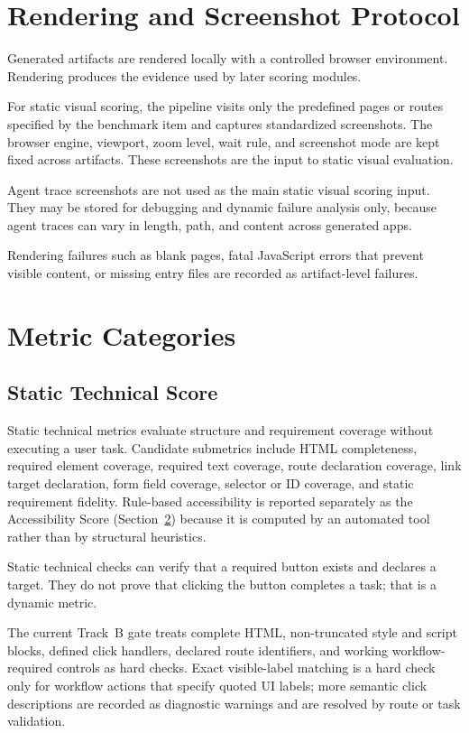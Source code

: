 \section{Rendering and Screenshot Protocol}
\label{sec:rendering}

Generated artifacts are rendered locally with a controlled browser environment.
Rendering produces the evidence used by later scoring modules.

For static visual scoring, the pipeline visits only the predefined pages or
routes specified by the benchmark item and captures standardized screenshots.
The browser engine, viewport, zoom level, wait rule, and screenshot mode are
kept fixed across artifacts. These screenshots are the input to static visual
evaluation.

Agent trace screenshots are not used as the main static visual scoring input.
They may be stored for debugging and dynamic failure analysis only, because
agent traces can vary in length, path, and content across generated apps.

Rendering failures such as blank pages, fatal JavaScript errors that prevent
visible content, or missing entry files are recorded as artifact-level failures.

\section{Metric Categories}
\label{sec:metric-categories}

\subsection{Static Technical Score}

Static technical metrics evaluate structure and requirement coverage without
executing a user task. Candidate submetrics include HTML completeness, required
element coverage, required text coverage, route declaration coverage, link
target declaration, form field coverage, selector or ID coverage, and static
requirement fidelity. Rule-based accessibility is reported separately as the
Accessibility Score (Section~\ref{sec:metric-categories}) because it is computed
by an automated tool rather than by structural heuristics.

Static technical checks can verify that a required button exists and declares a
target. They do not prove that clicking the button completes a task; that is a
dynamic metric.

The current Track~B gate treats complete HTML, non-truncated style and script
blocks, defined click handlers, declared route identifiers, and working
workflow-required controls as hard checks. Exact visible-label matching is a
hard check only for workflow actions that specify quoted UI labels; more
semantic click descriptions are recorded as diagnostic warnings and are resolved
by route or task validation.

